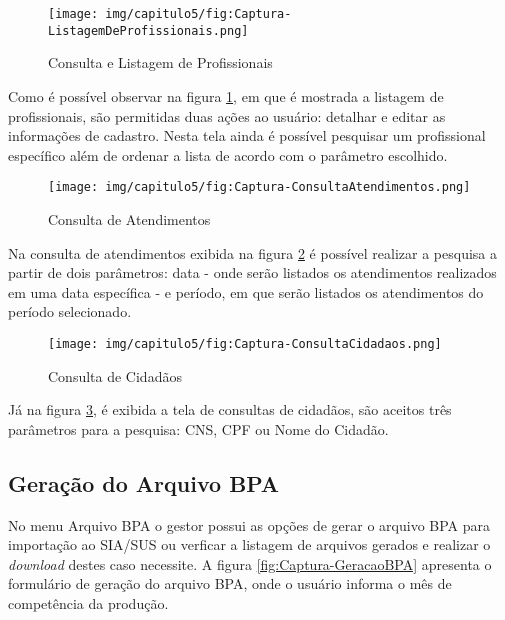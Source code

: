 \begin{figure}[H]
    \centering
     \caption{Consulta e Listagem de Profissionais}
    \texttt{[image: img/capitulo5/fig:Captura-ListagemDeProfissionais.png]}
    \label{fig:Captura-ListagemDeProfissionais}
\end{figure}
Como é possível observar na figura \ref{fig:Captura-ListagemDeProfissionais}, em que é mostrada a listagem de profissionais, são permitidas duas ações ao usuário: detalhar e editar as informações de cadastro. Nesta tela ainda é possível pesquisar um profissional específico além de  ordenar a lista de acordo com o parâmetro escolhido.

\begin{figure}[H]
    \centering
     \caption{Consulta de Atendimentos}
    \texttt{[image: img/capitulo5/fig:Captura-ConsultaAtendimentos.png]}
    \label{fig:Captura-ConsultaAtendimentos}
\end{figure}

Na consulta de atendimentos exibida na figura \ref{fig:Captura-ConsultaAtendimentos} é possível realizar a pesquisa a partir de dois parâmetros: data - onde serão listados os atendimentos realizados em uma data específica - e período, em que serão listados os atendimentos do período selecionado.

\begin{figure}[H]
    \centering
     \caption{Consulta de Cidadãos}
    \texttt{[image: img/capitulo5/fig:Captura-ConsultaCidadaos.png]}
    \label{fig:Captura-ConsultaCidadaos}
\end{figure}

Já na figura \ref{fig:Captura-ConsultaCidadaos}, é exibida a tela de consultas de cidadãos, são aceitos três parâmetros para a pesquisa: CNS, CPF ou Nome do Cidadão.

\subsection{Geração do Arquivo BPA}

No menu Arquivo BPA o gestor possui as opções de gerar o arquivo BPA para importação ao SIA/SUS ou verficar a listagem de arquivos gerados e realizar o \textit{download} destes caso necessite. A figura \ref{fig:Captura-GeracaoBPA} apresenta o formulário de geração do arquivo BPA, onde o usuário informa o mês de competência da produção.


